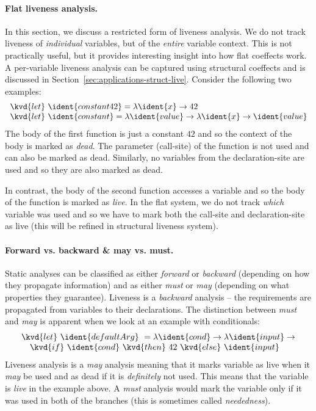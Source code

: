 \paragraph{Flat liveness analysis.}
In this section, we discuss a restricted form of liveness analysis. We do not track liveness of 
\emph{individual} variables, but of the \emph{entire} variable context. This is not practically
useful, but it provides interesting insight into how flat coeffects work. A per-variable liveness
analysis can be captured using structural coeffects and is discussed in Section~\ref{sec:applications-struct-live}.
Consider the following two examples:
%
\begin{equation*}
\begin{array}{l}
\kvd{let}~\ident{constant42} = \lambda \ident{x} \rightarrow 42\\
\kvd{let}~\ident{constant} = \lambda \ident{value} \rightarrow \lambda \ident{x} \rightarrow \ident{value}
\end{array}
\end{equation*}
%
The body of the first function is just a constant $42$ and so the context of the body is marked
as \emph{dead}. The parameter (call-site) of the function is not used and can also be marked as dead. 
Similarly, no variables from the declaration-site are used and so they are also marked as dead.

In contrast, the body of the second function accesses a variable  and so the body 
of the function is marked as \emph{live}. In the flat system, we do not track \emph{which} 
variable was used and so we have to mark both the call-site and declaration-site as live (this will
be refined in structural liveness system).

\paragraph{Forward vs. backward \& may vs. must.}
Static analyses can be classified as either \emph{forward} or \emph{backward} (depending on how they 
propagate information) and as either \emph{must} or \emph{may} (depending on what properties they
guarantee). Liveness is a \emph{backward} analysis -- the requirements are propagated from variables 
to their declarations. The distinction between \emph{must} and \emph{may} is apparent when we look 
at an example with conditionals:
%
\begin{equation*}
\begin{array}{l}
\kvd{let}~\ident{defaultArg}~= \lambda \ident{cond} \rightarrow \lambda \ident{input} \rightarrow\\
\quad\kvd{if}~\ident{cond}~\kvd{then}~42~\kvd{else}~\ident{input}
\end{array}
\end{equation*}
%
Liveness analysis is a \emph{may} analysis meaning that it marks variable as live when it
\emph{may} be used and as dead if it is \emph{definitely} not used. This means that the variable
 is \emph{live} in the example above. A \emph{must} analysis would mark the variable
only if it was used in both of the branches (this is sometimes called \emph{neededness}).

